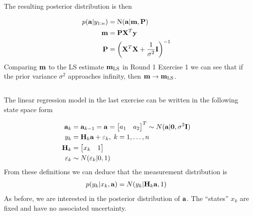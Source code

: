 \documentclass[a4paper,oneside,article]{memoir}
\begin{document}
\subsubsection{}

The resulting posterior distribution is then

\begin{align}
	p(\mathbf{a}|y_{1:n})&=\mathrm{N}(\mathbf{a}|\mathbf{m},\mathbf{P})\\
	\mathbf{m} &= \mathbf{P}\mathbf{X}^T\mathbf{y}\\ 
	\mathbf{P} &= \left(\mathbf{X}^T\mathbf{X}+\frac{1}{\sigma^2}\mathbf{I}\right)^{-1}
\end{align}
Comparing $\mathbf{m}$ to the LS estimate $\mathbf{m}_{\mathrm{LS}}$ in Round 1 Exercise 1 we can see that
if the prior variance $\sigma^2$ approaches infinity, then $\mathbf{m}\to\mathbf{m}_{\mathrm{LS}}$. 

\subsection{}

The linear regression model in the last exercise can be written in the following state space form

\begin{align}
	\mathbf{a}_k&=\mathbf{a}_{k-1}=\mathbf{a}=\begin{bmatrix} a_1 & a_2 \end{bmatrix}^T \sim N(\mathbf{a}|\mathbf{0},\sigma^2\mathbf{I})\\
	y_k&=\mathbf{H}_k\mathbf{a}+\varepsilon_k,\; k=1,\dots,n \\
	\mathbf{H}_k&=\begin{bmatrix} x_k & 1 \end{bmatrix} \\
	\varepsilon_k &\sim N(\varepsilon_k|0,1)
\end{align}
From these definitions we can deduce that the measurement distribution is
\begin{align}
	p(y_k|x_k,\mathbf{a})=N(y_k|\mathbf{H}_k\mathbf{a},1)
\end{align}
As before, we are interested in the posterior distribution of $\mathbf{a}$. The ``states'' $x_k$ are fixed
and have no associated uncertainty. 


\subsubsection{}
\end{document}
